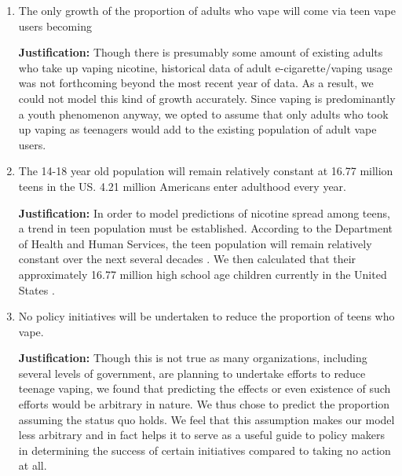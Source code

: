 \documentclass[12pt]{article}
\newcommand{\just}{\textbf{Justification: }}
\begin{document}
\begin{enumerate}
\just In order to create a model of trends in vaping among teens, it is necessary to determine a trend line that would potentially fit the data. Using the given data on teen cigarettes and realizing that the usage reaches a carrying capacity, it can be stipulated that teen vape usage will follow a similar trend. 

\item The only growth of the proportion of adults who vape will come via teen vape users becoming

\just Though there is presumably some amount of existing adults who take up vaping nicotine, historical data of adult e-cigarette/vaping usage was not forthcoming beyond the most recent year of data. As a result, we could not model this kind of growth accurately. Since vaping is predominantly a youth phenomenon anyway, we opted to assume that only adults who took up vaping as teenagers would add to the existing population of adult vape users.

\item The 14-18 year old population will remain relatively constant at 16.77 million teens in the US. 4.21 million Americans enter adulthood every year.

\just In order to model predictions of nicotine spread among teens, a trend in teen population must be established. According to the Department of Health and Human Services, the teen population will remain relatively constant over the next several decades \cite{hhsPopulation}. We then calculated that their approximately 16.77 million high school age children currently in the United States \cite{numberOfTeens}. 

\item No policy initiatives will be undertaken to reduce the proportion of teens who vape.

\just Though this is not true as many organizations, including several levels of government, are planning to undertake efforts to reduce teenage vaping, we found that predicting the effects or even existence of such efforts would be arbitrary in nature. We thus chose to predict the proportion assuming the status quo holds. We feel that this assumption makes our model less arbitrary and in fact helps it to serve as a useful guide to policy makers in determining the success of certain initiatives compared to taking no action at all. 
\end{enumerate}
\end{document}
